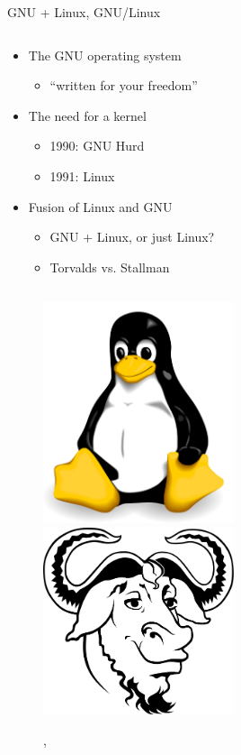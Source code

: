 \begin{frame}{GNU + Linux, GNU/Linux}
  \begin{column}{0.5\textwidth}
    \begin{itemize}
      \item The GNU operating system
        \begin{itemize}
          \item ``written for your freedom''~\cite[para. 48]{rms2011}
        \end{itemize}
      \item The need for a kernel
        \begin{itemize}
          \item 1990: GNU Hurd
          \item 1991: Linux
        \end{itemize}
      \item Fusion of Linux and GNU
        \begin{itemize}
          \item GNU + Linux, or just Linux?
          \item Torvalds vs. Stallman
        \end{itemize}
    \end{itemize}
  \end{column}
  \begin{column}{0.5\textwidth}\raggedleft{}
    \begin{figure}
      \includegraphics[width = 0.50\textwidth]{images/tux.png}
      \includegraphics[width = 0.50\textwidth]{images/gnu.png}
      \caption{\Protect\cite{tux}, \Protect\cite{gnu}}
    \end{figure}
  \end{column}
\end{frame}

